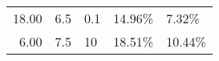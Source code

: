\documentclass[openany]{now}
\begin{document}
\begin{table}
\begin{center}
\begin{tabular}{rrl|ll}
   18.00 &                      6.5 &                    0.1 &  14.96\% &   7.32\% \\
    6.00 &                      7.5 &                     10 &  18.51\% &  10.44\% \\

\end{tabular}
\end{center}
\end{table}
\end{document}
